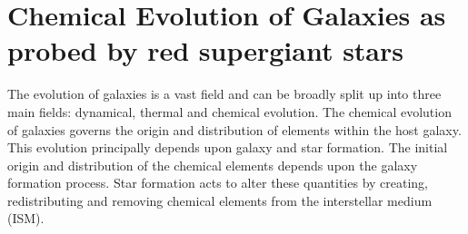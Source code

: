 







\section{Chemical Evolution of Galaxies as probed by red supergiant stars} %
\label{sec:chemical evolution}


The evolution of galaxies is a vast field and can be broadly split up into three main fields: dynamical, thermal and chemical evolution.
The chemical evolution of galaxies governs the origin and distribution of elements within the host galaxy.
This evolution principally depends upon galaxy and star formation.
The initial origin and distribution of the chemical elements depends upon the galaxy formation process.
Star formation acts to alter these quantities by creating, redistributing and removing chemical elements from the interstellar medium (ISM).

